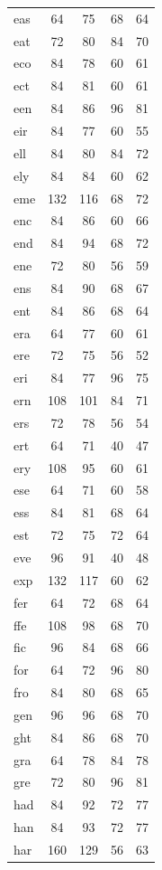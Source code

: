\documentclass[ms,electronic,twosidetoc,letterpaper,chaptercenter,parttop,lof,lot]{byumsphd}
\begin{document}
\begin{longtable}{| l | c c | c c |}
  eas & 64 & 75 & 68 & 64 \\
  eat & 72 & 80 & 84 & 70 \\
  eco & 84 & 78 & 60 & 61 \\
  ect & 84 & 81 & 60 & 61 \\
  een & 84 & 86 & 96 & 81 \\
  eir & 84 & 77 & 60 & 55 \\
  ell & 84 & 80 & 84 & 72 \\
  ely & 84 & 84 & 60 & 62 \\
  eme & 132 & 116 & 68 & 72 \\
  enc & 84 & 86 & 60 & 66 \\
  end & 84 & 94 & 68 & 72 \\
  ene & 72 & 80 & 56 & 59 \\
  ens & 84 & 90 & 68 & 67 \\
  ent & 84 & 86 & 68 & 64 \\
  era & 64 & 77 & 60 & 61 \\
  ere & 72 & 75 & 56 & 52 \\
  eri & 84 & 77 & 96 & 75 \\
  ern & 108 & 101 & 84 & 71 \\
  ers & 72 & 78 & 56 & 54 \\
  ert & 64 & 71 & 40 & 47 \\
  ery & 108 & 95 & 60 & 61 \\
  ese & 64 & 71 & 60 & 58 \\
  ess & 84 & 81 & 68 & 64 \\
  est & 72 & 75 & 72 & 64 \\
  eve & 96 & 91 & 40 & 48 \\
  exp & 132 & 117 & 60 & 62 \\
  fer & 64 & 72 & 68 & 64 \\
  ffe & 108 & 98 & 68 & 70 \\
  fic & 96 & 84 & 68 & 66 \\
  for & 64 & 72 & 96 & 80 \\
  fro & 84 & 80 & 68 & 65 \\
  gen & 96 & 96 & 68 & 70 \\
  ght & 84 & 86 & 68 & 70 \\
  gra & 64 & 78 & 84 & 78 \\
  gre & 72 & 80 & 96 & 81 \\
  had & 84 & 92 & 72 & 77 \\
  han & 84 & 93 & 72 & 77 \\
  har & 160 & 129 & 56 & 63 \\

\end{longtable}
\end{document}
